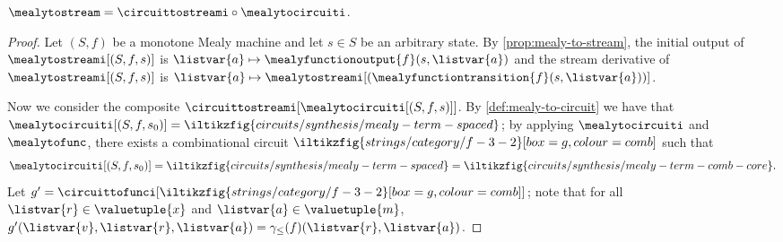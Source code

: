 \begin{theorem}\label{thm:mealy-to-circuit}
    \(
    \mealytostream = \circuittostreami \circ \mealytocircuiti
    \).
\end{theorem}
\begin{proof}
    Let \((S ,f)\) be a monotone Mealy machine and let \(s \in S\) be an arbitrary
    state.
    By \cref{prop:mealy-to-stream}, the initial output of
    \(\mealytostreami[(S, f, s)]\) is
    \(\listvar{a} \mapsto \mealyfunctionoutput{f}\mleft(s, \listvar{a}\mright)\)
    and the stream derivative of \(\mealytostreami[(S, f, s)]\) is \(
    \listvar{a}
    \mapsto
    \mealytostreami[(\mealyfunctiontransition{f}\mleft(s, \listvar{a}\mright))]
    \).

    Now we consider the composite
    \(\circuittostreami[\mealytocircuiti[(S, f, s)]]\).
    By \cref{def:mealy-to-circuit} we have that \(
    \mealytocircuiti[(S, f, s_0)]
    =
    \iltikzfig{circuits/synthesis/mealy-term-spaced}
    \); by applying \(\mealytocircuiti\) and \(\mealytofunc\),
    there exists a combinational circuit \(
    \iltikzfig{strings/category/f-3-2}[box=g,colour=comb]
    \) such that \[
        \mealytocircuiti[(S, f, s_0)]
        =
        \iltikzfig{circuits/synthesis/mealy-term-spaced}
        =
        \iltikzfig{circuits/synthesis/mealy-term-comb-core}.
    \]
    Let \(
    g^\prime
    =
    \circuittofunci[\iltikzfig{strings/category/f-3-2}[box=g,colour=comb]]
    \); note that for all \(\listvar{r} \in \valuetuple{x}\) and
    \(\listvar{a} \in \valuetuple{m}\),
    \(g^\prime(\listvar{v}, \listvar{r}, \listvar{a})
    =
    \gamma_\leq(f)(\listvar{r},\listvar{a})
    \).


\end{proof}

